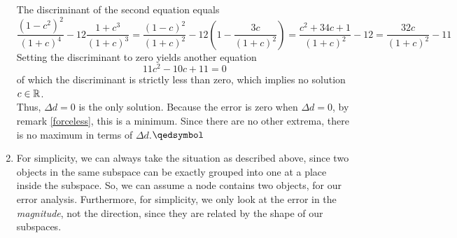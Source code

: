 \begin{enumerate}
The discriminant of the second equation equals
\begin{equation}
\frac{(1-c^2)^2}{(1+c)^4}-12\frac{1+c^3}{(1+c)^3} = \frac{(1-c)^2}{(1+c)^2}-12\left(1-\frac{3c}{(1+c)^2}\right) = \frac{c^2+34c+1}{(1+c)^2}-12 = \frac{32c}{(1+c)^2}-11
\end{equation}
Setting the discriminant to zero yields another equation
\begin{equation}
11c^2-10c+11 = 0
\end{equation}
of which the discriminant is strictly less than zero, which implies no solution $c\in \mathbb{R}$.\\
Thus, $\Delta d=0$ is the only solution. Because the error is zero when $\Delta d = 0$, by remark \ref{forceless}, this is a minimum. Since there are no other extrema, there is no maximum in terms of $\Delta d$.\hfill $\qedsymbol$
\item For simplicity, we can always take the situation as described above, since two objects in the same subspace can be exactly grouped into one at a place inside the subspace. So, we can assume a node contains two objects, for our error analysis. Furthermore, for simplicity, we only look at the error in the \textit{magnitude}, not the direction, since they are related by the shape of our subspaces.

\end{enumerate}

